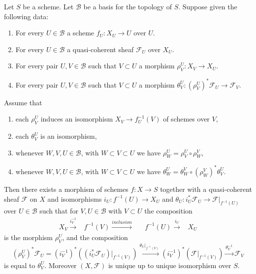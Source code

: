 \begin{lemma}
Let $S$ be a scheme.
Let $\mathcal{B}$ be a basis for the topology of $S$.
Suppose given the following data:
\begin{enumerate}
\item For every $U \in \mathcal{B}$ a scheme $f_U : X_U \to U$ over $U$.
\item For every $U \in \mathcal{B}$ a quasi-coherent sheaf $\mathcal{F}_U$
over $X_U$.
\item For every pair $U, V \in \mathcal{B}$ such that
$V \subset U$ a morphism $\rho^U_V : X_V \to X_U$.
\item  For every pair $U, V \in \mathcal{B}$ such that
$V \subset U$ a morphism
$\theta^U_V : (\rho^U_V)^*\mathcal{F}_U \to \mathcal{F}_V$.
\end{enumerate}
Assume that
\begin{enumerate}
\item[(a)] each $\rho^U_V$ induces an isomorphism
$X_V \to f_U^{-1}(V)$ of schemes over $V$,
\item[(b)] each $\theta^U_V$ is an isomorphism,
\item[(c)] whenever $W, V, U \in \mathcal{B}$, with
$W \subset V \subset U$ we have $\rho^U_W = \rho^U_V \circ \rho ^V_W$,
\item[(d)] whenever $W, V, U \in \mathcal{B}$, with
$W \subset V \subset U$ we have
$\theta^U_W = \theta^V_W \circ (\rho^V_W)^*\theta^U_V$.
\end{enumerate}
Then there exists a morphism of schemes $f : X \to S$
together with a quasi-coherent sheaf $\mathcal{F}$ on $X$
and isomorphisms $i_U : f^{-1}(U) \to X_U$ and
$\theta_U : i_U^*\mathcal{F}_U \to \mathcal{F}|_{f^{-1}(U)}$
over $U \in \mathcal{B}$ such that
for $V, U \in \mathcal{B}$ with $V \subset U$ the composition
$$
\begin{array}{ccccc}X_V \overset{i_V^{-1}}{\longrightarrow} & f^{-1}(V) \overset{inclusion}{\longrightarrow} &  & f^{-1}(U) \overset{i_U}{\longrightarrow} & X_U\end{array}
$$
is the morphism $\rho^U_V$, and the composition
\begin{equation}
\label{equation-glue}
(\rho^U_V)^*\mathcal{F}_U
=
(i_V^{-1})^*((i_U^*\mathcal{F}_U)|_{f^{-1}(V)})
\xrightarrow{\theta_U|_{f^{-1}(V)}}
(i_V^{-1})^*(\mathcal{F}|_{f^{-1}(V)})
\xrightarrow{\theta_V^{-1}}
\mathcal{F}_V
\end{equation}
is equal to $\theta^U_V$. Moreover $(X, \mathcal{F})$ is unique
up to unique isomorphism over $S$.
\end{lemma}

